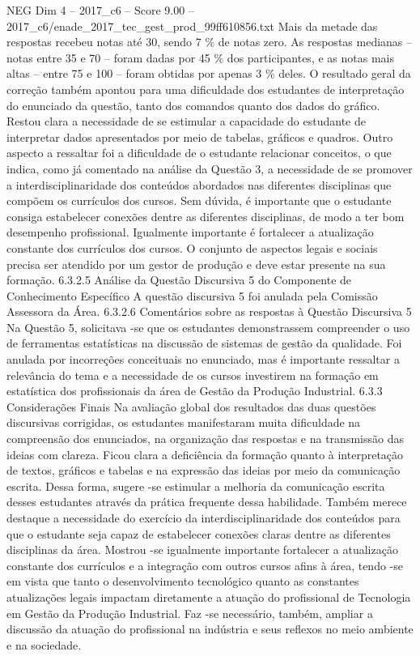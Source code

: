 \begin{textsample}{NEG Dim 4 – 2017\_c6 – Score 9.00 – 2017\_c6/enade\_2017\_tec\_gest\_prod\_99ff610856.txt}
Mais da metade das respostas recebeu notas até 30, sendo 7 \% de notas zero.
As respostas medianas – notas entre 35 e 70 – foram dadas por 45 \% dos participantes, e as notas mais altas – entre 75 e 100 – foram obtidas por apenas 3 \% deles.
O resultado geral da correção também apontou para uma dificuldade dos estudantes de interpretação do enunciado da questão, tanto dos comandos quanto dos dados do gráfico.
Restou clara a necessidade de se estimular a capacidade do estudante de interpretar dados apresentados por meio de tabelas, gráficos e quadros.
Outro aspecto a ressaltar foi a dificuldade de o estudante relacionar conceitos, o que indica, como já comentado na análise da Questão 3, a necessidade de se promover a interdisciplinaridade dos conteúdos abordados nas diferentes disciplinas que compõem os currículos dos cursos.
Sem dúvida, é importante que o estudante consiga estabelecer conexões dentre as diferentes disciplinas, de modo a ter bom desempenho profissional.
Igualmente importante é fortalecer a atualização constante dos currículos dos cursos.
O conjunto de aspectos legais e sociais precisa ser atendido por um gestor de produção e deve estar presente na sua formação. 6.3.2.5 Análise da Questão Discursiva 5 do Componente de Conhecimento Específico A questão discursiva 5 foi anulada pela Comissão Assessora da Área. 6.3.2.6 Comentários sobre as respostas à Questão Discursiva 5 Na Questão 5, solicitava -se que os estudantes demonstrassem compreender o uso de ferramentas estatísticas na discussão de sistemas de gestão da qualidade.
Foi anulada por incorreções conceituais no enunciado, mas é importante ressaltar a relevância do tema e a necessidade de os cursos investirem na formação em estatística dos profissionais da área de Gestão da Produção Industrial. 6.3.3 Considerações Finais Na avaliação global dos resultados das duas questões discursivas corrigidas, os estudantes manifestaram muita dificuldade na compreensão dos enunciados, na organização das respostas e na transmissão das ideias com clareza.
Ficou clara a deficiência da formação quanto à interpretação de textos, gráficos e tabelas e na expressão das ideias por meio da comunicação escrita.
Dessa forma, sugere -se estimular a melhoria da comunicação escrita desses estudantes através da prática frequente dessa habilidade.
Também merece destaque a necessidade do exercício da interdisciplinaridade dos conteúdos para que o estudante seja capaz de estabelecer conexões claras dentre as diferentes disciplinas da área.
Mostrou -se igualmente importante fortalecer a atualização constante dos currículos e a integração com outros cursos afins à área, tendo -se em vista que tanto o desenvolvimento tecnológico quanto as constantes atualizações legais impactam diretamente a atuação do profissional de Tecnologia em Gestão da Produção Industrial.
Faz -se necessário, também, ampliar a discussão da atuação do profissional na indústria e seus reflexos no meio ambiente e na sociedade.

\end{textsample}
